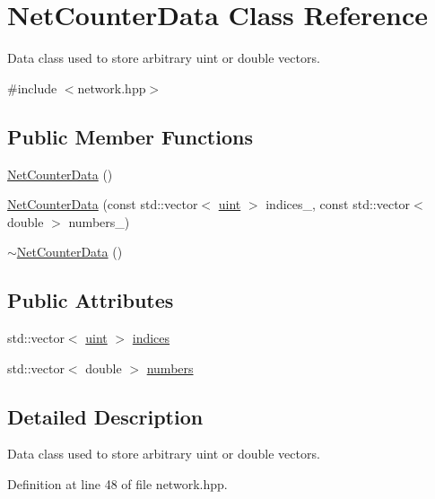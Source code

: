 \hypertarget{class_net_counter_data}{}\section{Net\+Counter\+Data Class Reference}
\label{class_net_counter_data}


Data class used to store arbitrary uint or double vectors.  




{\ttfamily \#include $<$network.\+hpp$>$}

\subsection*{Public Member Functions}
\begin{DoxyCompactItemize}
\item 
\hyperlink{class_net_counter_data_ac3a5083286ad4fad43e6b6d5db1f7caa}{Net\+Counter\+Data} ()
\item 
\hyperlink{class_net_counter_data_ac816e1f8892a4d6f500df387309c1b1b}{Net\+Counter\+Data} (const std\+::vector$<$ \hyperlink{typedefs_8hpp_a91ad9478d81a7aaf2593e8d9c3d06a14}{uint} $>$ indices\+\_\+, const std\+::vector$<$ double $>$ numbers\+\_\+)
\item 
\hyperlink{class_net_counter_data_a2e88fcc7f0296d791fe9f0facd24489f}{$\sim$\+Net\+Counter\+Data} ()
\end{DoxyCompactItemize}
\subsection*{Public Attributes}
\begin{DoxyCompactItemize}
\item 
std\+::vector$<$ \hyperlink{typedefs_8hpp_a91ad9478d81a7aaf2593e8d9c3d06a14}{uint} $>$ \hyperlink{class_net_counter_data_ae2f47af99f3fa785d3faac089ab90d83}{indices}
\item 
std\+::vector$<$ double $>$ \hyperlink{class_net_counter_data_ad218e01cd14fb4abfbe21d8d92a6cbd3}{numbers}
\end{DoxyCompactItemize}


\subsection{Detailed Description}
Data class used to store arbitrary uint or double vectors. 

Definition at line 48 of file network.\+hpp.



